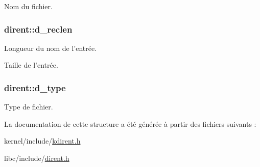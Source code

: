 Nom du fichier. \hypertarget{structdirent_a7cc67dd4ba5a8bed7f107f249957688d}{
\subsubsection[{d\-\_\-reclen}]{ dirent\-::d\-\_\-reclen}}\label{structdirent_a7cc67dd4ba5a8bed7f107f249957688d}
Longueur du nom de l'entrée.

Taille de l'entrée. \hypertarget{structdirent_a948760e3b7f607213a19f85e7af15a32}{
\subsubsection[{d\-\_\-type}]{ dirent\-::d\-\_\-type}}\label{structdirent_a948760e3b7f607213a19f85e7af15a32}
Type de fichier. 

La documentation de cette structure a été générée à partir des fichiers suivants \-:\begin{DoxyCompactItemize}
\item 
kernel/include/\hyperlink{kdirent_8h}{kdirent.\-h}\item 
libc/include/\hyperlink{dirent_8h}{dirent.\-h}\end{DoxyCompactItemize}
